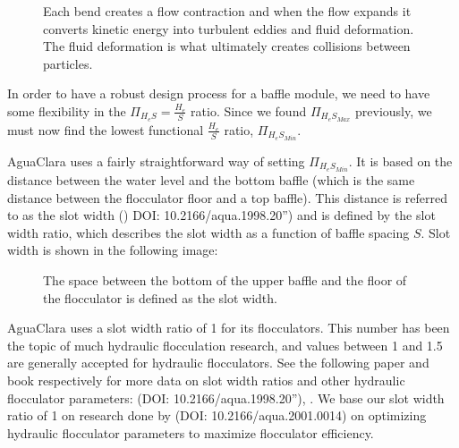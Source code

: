 \documentclass[letterpaper,10pt,english]{sphinxmanual}
\let\sphinxpxdimen\pdfpxdimen\else\newdimen\sphinxpxdimen
\begin{document}
\begin{figure}[htbp]
\centering
\capstart

\noindent\sphinxincludegraphics[width=700\sphinxpxdimen]{{CFD_full_channel}.jpg}
\caption{Each bend creates a flow contraction and when the flow expands it converts kinetic energy into turbulent eddies and fluid deformation. The fluid deformation is what ultimately creates collisions between particles.}\label{\detokenize{Flocculation/Floc_Design:id9}}\label{\detokenize{Flocculation/Floc_Design:figure-cfd-full-channel}}\end{figure}

In order to have a robust design process for a baffle module, we need to have some flexibility in the \(\Pi_{H_eS} = \frac{H_e}{S}\) ratio. Since we found \(\Pi_{H_eS_{Max}}\) previously, we must now find the lowest functional \(\frac{H_e}{S}\) ratio, \(\Pi_{H_eS_{Min}}\).

AguaClara uses a fairly straightforward way of setting \(\Pi_{H_eS_{Min}}\). It is based on the distance between the water level and the bottom baffle (which is the same distance between the flocculator floor and a top baffle). This distance is referred to as the slot width ()  DOI: 10.2166/aqua.1998.20”) and is defined by the slot width ratio, which describes the slot width as a function of baffle spacing \(S\). Slot width is shown in the following image:

\begin{figure}[htbp]
\centering
\capstart

\noindent\sphinxincludegraphics[width=600\sphinxpxdimen]{{Slot_width_description}.jpg}
\caption{The space between the bottom of the upper baffle and the floor of the flocculator is defined as the slot width.}\label{\detokenize{Flocculation/Floc_Design:id10}}\label{\detokenize{Flocculation/Floc_Design:figure-slot-width-description}}\end{figure}

AguaClara uses a slot width ratio of 1 for its flocculators. This number has been the topic of much hydraulic flocculation research, and values between 1 and 1.5 are generally accepted for hydraulic flocculators. See the following paper and book respectively for more data on slot width ratios and other hydraulic flocculator parameters:   (DOI: 10.2166/aqua.1998.20”), . We base our slot width ratio of 1 on research done by  (DOI: 10.2166/aqua.2001.0014) on optimizing hydraulic flocculator parameters to maximize flocculator efficiency.
\end{document}
